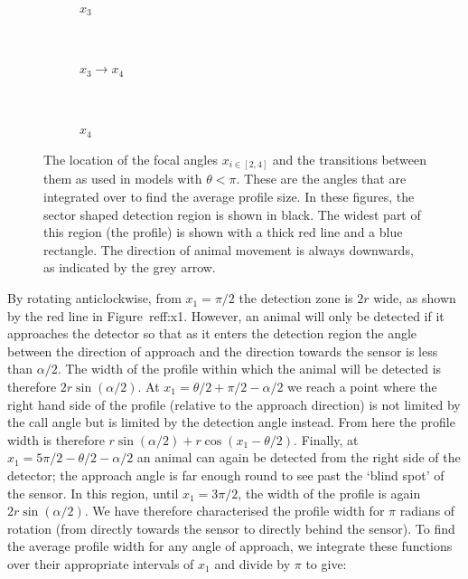 \documentclass[a4paper,10pt,reqno,oneside]{amsart}
\begin{document}
\begin{figure}[t]
	\begin{subfigure}[t]{0.22\textwidth}
                \centering
                \caption{$x_3$}
                \label{f:x4}
        \end{subfigure}%
	~
	\begin{subfigure}[t]{0.22\textwidth}
                \centering
                \caption{$x_3 \rightarrow x_4$}
                \label{f:x5}
        \end{subfigure}%
	~ 
	\begin{subfigure}[t]{0.22\textwidth}
                \centering
                \caption{$x_4$}
                \label{f:x6}
        \end{subfigure}%
\caption{The location of the focal angles $x_{i\in[2,4]}$ and the transitions between them as used in models with $\theta<\pi$. These are the angles that are integrated over to find the average profile size. In these figures, the sector shaped detection region is shown in black. The widest part of this region (the profile) is shown with a thick red line and a blue rectangle. The direction of animal movement is always downwards, as indicated by the grey arrow. 
     }
\label{f:xis}
\end{figure}

By rotating anticlockwise, from $x_1  = \pi/2$ the detection zone is $2r$ wide, as shown by the red line in Figure~ref{f:x1}. However, an animal will only be detected if it approaches the detector so that as it enters the detection region the angle between the direction of approach and the direction towards the sensor is less than $\alpha/2$. The width of the profile within which the animal will be detected is therefore $2r\sin(\alpha/2)$. At $x_1  = \theta/2 + \pi/2 - \alpha/2$ we reach a point where the right hand side of the profile (relative to the approach direction) is not limited by the call angle but is limited by the detection angle instead. From here the profile width is therefore $r\sin( \alpha/2) + r\cos( x_1  - \theta/2)$. Finally, at $x_1  = 5\pi/2 - \theta/2  - \alpha/2$ an animal can again be detected from the right side of the detector; the approach angle is far enough round to see past the `blind spot' of the sensor. In this region, until $x_1  = 3\pi/2$, the width of the profile is again $2r\sin( \alpha/2)$. We have therefore characterised the profile width for $\pi$ radians of rotation (from directly towards the sensor to directly behind the sensor). To find the average profile width for any angle of approach, we integrate these functions over their appropriate intervals of $x_1 $ and divide by $\pi$ to give:
\end{document}
